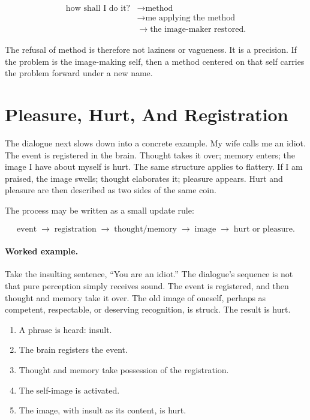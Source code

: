 \begin{align}
\text{how shall I do it?}
&\longrightarrow \text{method} \\
&\longrightarrow \text{me applying the method} \\
&\longrightarrow \text{the image-maker restored}.
\end{align}

The refusal of method is therefore not laziness or vagueness. It is a precision. If the problem is the image-making self, then a method centered on that self carries the problem forward under a new name.

\section{Pleasure, Hurt, And Registration}

The dialogue next slows down into a concrete example. My wife calls me an idiot. The event is registered in the brain. Thought takes it over; memory enters; the image I have about myself is hurt. The same structure applies to flattery. If I am praised, the image swells; thought elaborates it; pleasure appears. Hurt and pleasure are then described as two sides of the same coin.

The process may be written as a small update rule:

\begin{equation}
\text{event}
\;\longrightarrow\;
\text{registration}
\;\longrightarrow\;
\text{thought/memory}
\;\longrightarrow\;
\text{image}
\;\longrightarrow\;
\text{hurt or pleasure}.
\end{equation}

\paragraph{Worked example.}
Take the insulting sentence, ``You are an idiot.'' The dialogue's sequence is not that pure perception simply receives sound. The event is registered, and then thought and memory take it over. The old image of oneself, perhaps as competent, respectable, or deserving recognition, is struck. The result is hurt.

\begin{enumerate}
\item A phrase is heard: insult.
\item The brain registers the event.
\item Thought and memory take possession of the registration.
\item The self-image is activated.
\item The image, with insult as its content, is hurt.
\end{enumerate}

